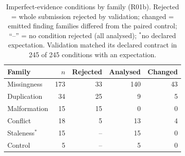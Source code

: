 \begin{table}[!htbp]
\caption{Imperfect-evidence conditions by family (R01b). Rejected = whole submission
rejected by validation; changed = emitted finding families differed from the paired
control; ``--'' = no condition rejected (all analysed); $^{*}$no declared expectation. Validation matched its declared contract in 245 of
245 conditions with an expectation.}
\label{tab:robust}
\centering
\scriptsize
\begin{tabular}{@{}lrrrr@{}}
\toprule
Family & $n$ & Rejected & Analysed & Changed \\
\midrule
Missingness & 173 & 33 & 140 & 43 \\
Duplication & 34 & 25 & 9 & 5 \\
Malformation & 15 & 15 & 0 & 0 \\
Conflict & 18 & 5 & 13 & 4 \\
Staleness$^{*}$ & 15 & -- & 15 & 0 \\
Control & 5 & -- & 5 & 0 \\
\bottomrule
\end{tabular}
\end{table}
